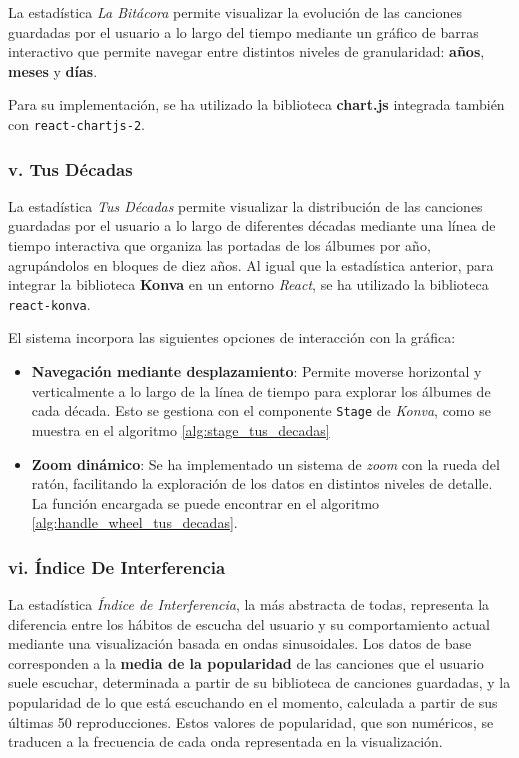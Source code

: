 La estadística \textit{La Bitácora} permite visualizar la evolución de las canciones guardadas por el usuario a lo largo del tiempo mediante un gráfico de barras interactivo que permite navegar entre distintos niveles de granularidad: \textbf{años}, \textbf{meses} y \textbf{días}.

Para su implementación, se ha utilizado la biblioteca \textbf{chart.js} integrada también con \texttt{react-chartjs-2}.

\subsubsection*{v. Tus Décadas}

La estadística \textit{Tus Décadas} permite visualizar la distribución de las canciones guardadas por el usuario a lo largo de diferentes décadas mediante una línea de tiempo interactiva que organiza las portadas de los álbumes por año, agrupándolos en bloques de diez años. Al igual que la estadística anterior, para integrar la biblioteca \textbf{Konva} en un entorno \textit{React}, se ha utilizado la biblioteca \texttt{react-konva}.

El sistema incorpora las siguientes opciones de interacción con la gráfica:
\begin{itemize}
    \item \textbf{Navegación mediante desplazamiento}: Permite moverse horizontal y verticalmente a lo largo de la línea de tiempo para explorar los álbumes de cada década. Esto se gestiona con el componente \texttt{Stage} de \textit{Konva}, como se muestra en el algoritmo \ref{alg:stage_tus_decadas}
    \item \textbf{Zoom dinámico}: Se ha implementado un sistema de \textit{zoom} con la rueda del ratón, facilitando la exploración de los datos en distintos niveles de detalle. La función encargada se puede encontrar en el algoritmo \ref{alg:handle_wheel_tus_decadas}.
\end{itemize}

\subsubsection*{vi. Índice De Interferencia}

La estadística \textit{Índice de Interferencia}, la más abstracta de todas, representa la diferencia entre los hábitos de escucha del usuario y su comportamiento actual mediante una visualización basada en ondas sinusoidales. Los datos de base corresponden a la \textbf{media de la popularidad} de las canciones que el usuario suele escuchar, determinada a partir de su biblioteca de canciones guardadas, y la popularidad de lo que está escuchando en el momento, calculada a partir de sus últimas 50 reproducciones. Estos valores de popularidad, que son numéricos, se traducen a la frecuencia de cada onda representada en la visualización.

